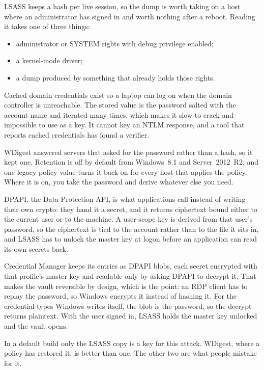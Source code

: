 LSASS keeps a hash per live session, so the dump is worth taking on a host where an administrator
has signed in and worth nothing after a reboot. Reading it takes one of three things:

\begin{itemize}[leftmargin=1.6em]
  \item administrator or SYSTEM rights with debug privilege enabled;
  \item a kernel-mode driver;
  \item a dump produced by something that already holds those rights.
\end{itemize}

Cached domain credentials exist so a laptop can log on when the domain controller is unreachable.
The stored value is the password salted with the account name and iterated many times, which makes
it slow to crack and impossible to use as a key. It cannot key an NTLM response, and a tool that
reports cached credentials has found a verifier.

WDigest answered servers that asked for the password rather than a hash, so it kept one. Retention
is off by default from Windows~8.1 and Server~2012~R2, and one legacy policy value turns it back on
for every host that applies the policy. Where it is on, you take the password and derive whatever
else you need.

DPAPI, the Data Protection API, is what applications call instead of writing their own crypto:
they hand it a secret, and it returns ciphertext bound either to the current user or to the machine.
A user-scope key is derived from that user's password, so the ciphertext is tied to the account
rather than to the file it sits in, and LSASS has to unlock the master key at logon before an application
can read its own secrets back.

Credential Manager keeps its entries as DPAPI blobs, each secret encrypted with that profile's
master key and readable only by asking DPAPI to decrypt it. That makes the vault reversible by
design, which is the point: an RDP client has to replay the password, so Windows encrypts it instead
of hashing it. For the credential types Windows writes itself, the blob is the password, so the
decrypt returns plaintext. With the user signed in, LSASS holds the master key unlocked and the
vault opens.

In a default build only the LSASS copy is a key for this attack. WDigest, where a policy has
restored it, is better than one. The other two are what people mistake for it.

